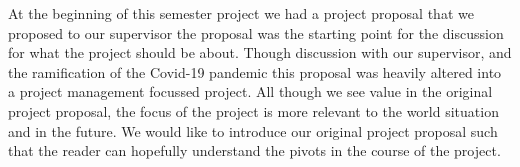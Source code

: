 At the beginning of this semester project we had a project proposal that we proposed to our supervisor the proposal was the starting point for the discussion for what the project should be about. Though discussion with our supervisor, and the ramification of the Covid-19 pandemic this proposal was heavily altered into a project management focussed project. All though we see value in the original project proposal, the focus of the project is more relevant to the world situation and in the future. We would like to introduce our original project proposal such that the reader can hopefully understand the pivots in the course of the project. 